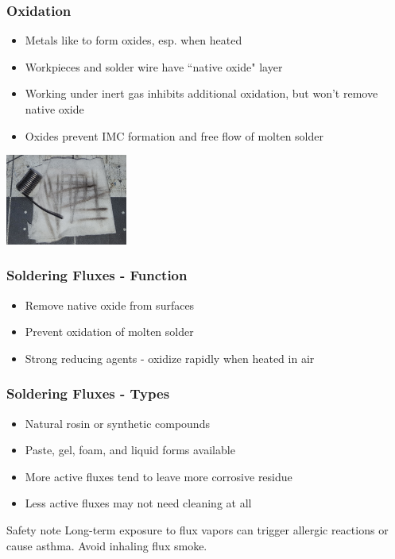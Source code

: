 \documentclass{beamer}
\begin{document}
\begin{frame}
\frametitle{Oxidation}
\begin{itemize}
\item Metals like to form oxides, esp. when heated
\item Workpieces and solder wire have ``native oxide" layer
\item Working under inert gas inhibits additional oxidation, but won't remove native oxide
\item Oxides prevent IMC formation and free flow of molten solder
\end{itemize}
\begin{center}
\includegraphics[width=4cm,keepaspectratio]{solder-oxidation.jpg}
\end{center}
\end{frame}

\begin{frame}
\frametitle{Soldering Fluxes - Function}
\begin{itemize}
\item Remove native oxide from surfaces
\item Prevent oxidation of molten solder
\item Strong reducing agents - oxidize rapidly when heated in air
\end{itemize}
\end{frame}

\begin{frame}
\frametitle{Soldering Fluxes - Types}
\begin{itemize}
\item Natural rosin or synthetic compounds
\item Paste, gel, foam, and liquid forms available
\item More active fluxes tend to leave more corrosive residue
\item Less active fluxes may not need cleaning at all
\end{itemize}
\begin{alertblock}{Safety note}
Long-term exposure to flux vapors can trigger allergic reactions or cause asthma. Avoid inhaling flux smoke.
\end{alertblock}
\end{frame}
\end{document}
